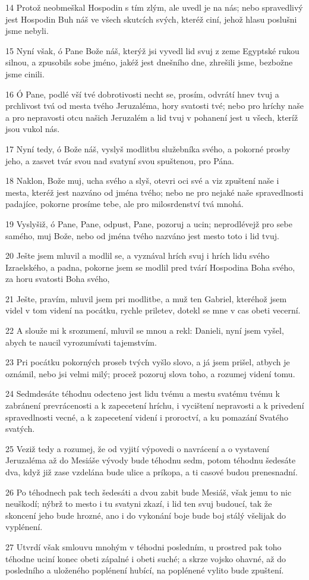 \par 14 Protož neobmeškal Hospodin s tím zlým, ale uvedl je na nás; nebo spravedlivý jest Hospodin Buh náš ve všech skutcích svých, kteréž ciní, jehož hlasu poslušni jsme nebyli.
\par 15 Nyní však, ó Pane Bože náš, kterýž jsi vyvedl lid svuj z zeme Egyptské rukou silnou, a zpusobils sobe jméno, jakéž jest dnešního dne, zhrešili jsme, bezbožne jsme cinili.
\par 16 Ó Pane, podlé vší tvé dobrotivosti necht se, prosím, odvrátí hnev tvuj a prchlivost tvá od mesta tvého Jeruzaléma, hory svatosti tvé; nebo pro hríchy naše a pro nepravosti otcu našich Jeruzalém a lid tvuj v pohanení jest u všech, kteríž jsou vukol nás.
\par 17 Nyní tedy, ó Bože náš, vyslyš modlitbu služebníka svého, a pokorné prosby jeho, a zasvet tvár svou nad svatyní svou spuštenou, pro Pána.
\par 18 Naklon, Bože muj, ucha svého a slyš, otevri oci své a viz zpuštení naše i mesta, kteréž jest nazváno od jména tvého; nebo ne pro nejaké naše spravedlnosti padajíce, pokorne prosíme tebe, ale pro milosrdenství tvá mnohá.
\par 19 Vyslyšiž, ó Pane, Pane, odpust, Pane, pozoruj a ucin; neprodlévejž pro sebe samého, muj Bože, nebo od jména tvého nazváno jest mesto toto i lid tvuj.
\par 20 Ješte jsem mluvil a modlil se, a vyznával hrích svuj i hrích lidu svého Izraelského, a padna, pokorne jsem se modlil pred tvárí Hospodina Boha svého, za horu svatosti Boha svého,
\par 21 Ješte, pravím, mluvil jsem pri modlitbe, a muž ten Gabriel, kteréhož jsem videl v tom videní na pocátku, rychle priletev, dotekl se mne v cas obeti vecerní.
\par 22 A slouže mi k srozumení, mluvil se mnou a rekl: Danieli, nyní jsem vyšel, abych te naucil vyrozumívati tajemstvím.
\par 23 Pri pocátku pokorných proseb tvých vyšlo slovo, a já jsem prišel, atbych je oznámil, nebo jsi velmi milý; procež pozoruj slova toho, a rozumej videní tomu.
\par 24 Sedmdesáte téhodnu odecteno jest lidu tvému a mestu svatému tvému k zabránení prevrácenosti a k zapecetení hríchu, i vycištení nepravosti a k privedení spravedlnosti vecné, a k zapecetení videní i proroctví, a ku pomazání Svatého svatých.
\par 25 Veziž tedy a rozumej, že od vyjití výpovedi o navrácení a o vystavení Jeruzaléma až do Mesiáše vývody bude téhodnu sedm, potom téhodnu šedesáte dva, když již zase vzdelána bude ulice a príkopa, a ti casové budou prenesnadní.
\par 26 Po téhodnech pak tech šedesáti a dvou zabit bude Mesiáš, však jemu to nic neuškodí; nýbrž to mesto i tu svatyni zkazí, i lid ten svuj budoucí, tak že skoncení jeho bude hrozné, ano i do vykonání boje bude boj stálý všelijak do vyplénení.
\par 27 Utvrdí však smlouvu mnohým v téhodni posledním, u prostred pak toho téhodne uciní konec obeti zápalné i obeti suché; a skrze vojsko ohavné, až do posledního a uloženého poplénení hubící, na poplénené vylito bude zpuštení.

